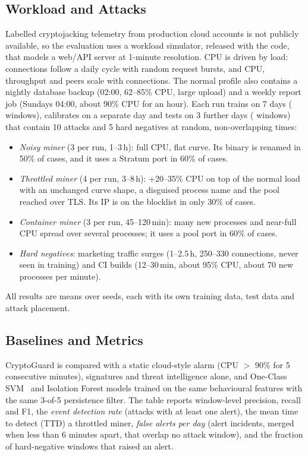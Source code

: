 \documentclass[conference]{IEEEtran}
\begin{document}
\subsection{Workload and Attacks}
Labelled cryptojacking telemetry from production cloud accounts is not publicly available, so the evaluation uses a workload simulator, released with the code, that models a web/API server at 1-minute resolution. CPU is driven by load: connections follow a daily cycle with random request bursts, and CPU, throughput and peers scale with connections. The normal profile also contains a nightly database backup (02:00, 62--85\% CPU, large upload) and a weekly report job (Sundays 04:00, about 90\% CPU for an hour). Each run trains on 7 days (\trainWindows{} windows), calibrates on a separate day and tests on 3 further days (\testWindows{} windows) that contain 10 attacks and 5 hard negatives at random, non-overlapping times:
\begin{itemize}
  \item \emph{Noisy miner} (3 per run, 1--3\,h): full CPU, flat curve. Its binary is renamed in 50\% of cases, and it uses a Stratum port in 60\% of cases.
  \item \emph{Throttled miner} (4 per run, 3--8\,h): +20--35\% CPU on top of the normal load with an unchanged curve shape, a disguised process name and the pool reached over TLS. Its IP is on the blocklist in only 30\% of cases.
  \item \emph{Container miner} (3 per run, 45--120\,min): many new processes and near-full CPU spread over several processes; it uses a pool port in 60\% of cases.
  \item \emph{Hard negatives}: marketing traffic surges (1--2.5\,h, 250--330 connections, never seen in training) and CI builds (12--30\,min, about 95\% CPU, about 70 new processes per minute).
\end{itemize}
All results are means over \nSeeds{} seeds, each with its own training data, test data and attack placement.

\subsection{Baselines and Metrics}
CryptoGuard is compared with a static cloud-style alarm (CPU $>$ 90\% for 5 consecutive minutes), signatures and threat intelligence alone, and One-Class SVM~\cite{scholkopf2001} and Isolation Forest models trained on the same behavioural features with the same 3-of-5 persistence filter. The table reports window-level precision, recall and F1, the \emph{event detection rate} (attacks with at least one alert), the mean time to detect (TTD) a throttled miner, \emph{false alerts per day} (alert incidents, merged when less than 6 minutes apart, that overlap no attack window), and the fraction of hard-negative windows that raised an alert.
\end{document}
